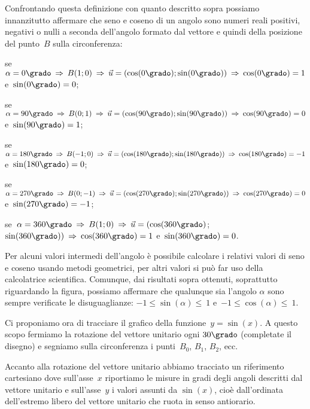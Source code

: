 Confrontando questa definizione con quanto descritto sopra possiamo innanzitutto affermare che seno e coseno di un angolo sono numeri reali
positivi, negativi o nulli a seconda dell'angolo formato dal vettore e quindi della posizione del punto~$B$ sulla circonferenza:
\begin{itemize*}
\item se~$\alpha=0\grado \:\Rightarrow\: B(1;0) \:\Rightarrow\: \vec{u}=(\cos(0\grado);\sin (0\grado)) \:\Rightarrow\: \cos(0\grado)=1$ e~$\sin(0\grado)=0$;
\item se~$\alpha=90\grado \:\Rightarrow\: B(0;1) \:\Rightarrow\: \vec{u}=(\cos(90\grado);\sin(90\grado)) \:\Rightarrow\: \cos(90\grado)=0$ e~$\sin(90\grado)=1$;
\item se~$\alpha=180\grado \:\Rightarrow\: B(-1;0) \:\Rightarrow\: \vec{u}=(\cos(180\grado);\sin(180\grado)) \:\Rightarrow\: \cos(180\grado)=-1$ e~$\sin(180\grado)=0$;
\item se~$\alpha=270\grado \:\Rightarrow\: B(0;-1) \:\Rightarrow\: \vec{u}=(\cos(270\grado);\sin(270\grado)) \:\Rightarrow\: \cos(270\grado)=0$ e~$\sin(270\grado)=-1$;
\item se~$\alpha=360\grado \:\Rightarrow\: B(1;0) \:\Rightarrow\: \vec{u}=(\cos(360\grado)$;$\sin (360\grado)) \:\Rightarrow\: \cos(360\grado)=1$ e~$\sin(360\grado)=0$.
\end{itemize*}

Per alcuni valori intermedi dell'angolo è possibile calcolare i relativi valori di seno e coseno usando metodi geometrici, per altri valori si può far uso
della calcolatrice scientifica.
Comunque, dai risultati sopra ottenuti, soprattutto riguardando la figura, possiamo affermare che qualunque sia l'angolo $\alpha$ sono sempre verificate le disuguaglianze:
$-1\le\sin(\alpha)\le~1$ e~$-1\le\cos(\alpha)\le~1$.

Ci proponiamo ora di tracciare il grafico della funzione~$y = \sin(x)$. A questo scopo fermiamo la rotazione del vettore unitario ogni
$30\grado$ (completate il disegno) e segniamo sulla circonferenza i punti~$B_0$, $B_1$, $B_2$, ecc.
\begin{center}
 
\end{center}


Accanto alla rotazione del vettore unitario abbiamo tracciato un riferimento cartesiano dove sull'asse~$x$ riportiamo le misure in gradi
degli angoli descritti dal vettore unitario e sull'asse~$y$ i valori assunti da $\sin(x)$, cioè dall'ordinata dell'estremo libero
del vettore unitario che ruota in senso antiorario.

